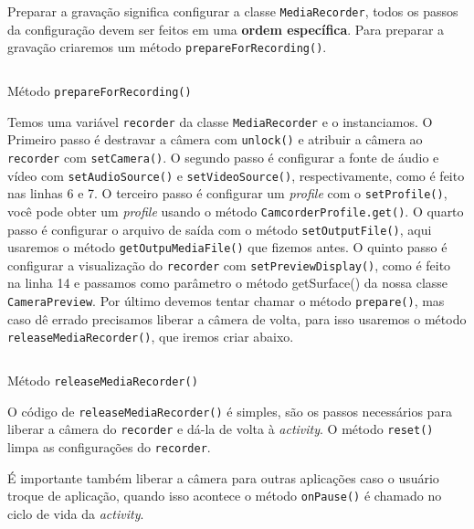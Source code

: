 \documentclass[a4paper,12pt,brazil,oneside]{book}
\begin{document}
		Preparar a gravação significa configurar a classe \texttt{MediaRecorder}, todos os passos da configuração devem ser feitos em uma \textbf{ordem específica}. Para preparar a gravação criaremos um método \texttt{prepareForRecording()}.

		\begin{listing}[H]
		\inputminted[linenos=true,fontsize=\small,frame=lines, framesep=2mm, tabsize=2,numbersep=5pt]{java}{src/api/camera/prepareVideo.java}
		\caption{Método \texttt{prepareForRecording()}}
		\label{code:preparevideo}
		\end{listing} 			

		Temos uma variável \texttt{recorder} da classe \texttt{MediaRecorder} e o instanciamos. O Primeiro passo é destravar a câmera com \texttt{unlock()} e atribuir a câmera ao \texttt{recorder} com \texttt{setCamera()}. O segundo passo é configurar a fonte de áudio e vídeo com \texttt{setAudioSource()} e \texttt{setVideoSource()}, respectivamente, como é feito nas linhas 6 e 7. O terceiro passo é configurar um \emph{profile} com o \texttt{setProfile()}, você pode obter um \emph{profile} usando o método \texttt{CamcorderProfile.get()}. O quarto passo é configurar o arquivo de saída com o método \texttt{setOutputFile()}, aqui usaremos o método \texttt{getOutpuMediaFile()} que fizemos antes. O quinto passo é configurar a visualização do \texttt{recorder} com \texttt{setPreviewDisplay()}, como é feito na linha 14 e passamos como parâmetro o método getSurface() da nossa classe \texttt{CameraPreview}. Por último devemos tentar chamar o método \texttt{prepare()}, mas caso dê errado precisamos liberar a câmera de volta, para isso usaremos o método \\ \texttt{releaseMediaRecorder()}, que iremos criar abaixo.

		\begin{listing}[H]
		\inputminted[linenos=true,fontsize=\small,frame=lines, framesep=2mm, tabsize=2,numbersep=5pt]{java}{src/api/camera/releaseRecorder.java}
		\caption{Método \texttt{releaseMediaRecorder()}}
		\label{code:releaserecorder}
		\end{listing} 			

		O código de \texttt{releaseMediaRecorder()} é simples, são os passos necessários para liberar a câmera do \texttt{recorder} e dá-la de volta à \emph{activity}.  O método \texttt{reset()} limpa as configurações do \texttt{recorder}.

		É importante também liberar a câmera para outras aplicações caso o usuário troque de aplicação, quando isso acontece o método \texttt{onPause()} é chamado no ciclo de vida da \emph{activity}.
\end{document}
